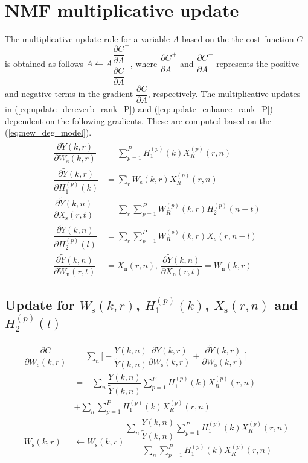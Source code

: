 \section{NMF multiplicative update}
\label{sec:nmf_update}
The multiplicative update rule for a variable $A$ based on the the cost function $C$ is obtained as follows $A \leftarrow A \dfrac{\dfrac{\partial C}{\partial A}^-}{\dfrac{\partial C}{\partial A}^+}$,
where $\dfrac{\partial C}{\partial A}^+$ and $\dfrac{\partial C}{\partial A}^-$ represents the positive and negative terms in the gradient $ \dfrac{\partial C}{\partial A}$, respectively. 
The multiplicative updates in (\ref{eq:update_dereverb_rank_P}) and (\ref{eq:update_enhance_rank_P}) dependent on the following gradients. These are computed based on the (\ref{eq:new_deg_model}).
\begin{align}
\dfrac{\partial \tilde{Y}(k,r)}{\partial W_{\text{s}}(k,r)} & =\sum_{p=1}^P H_1^{(p)}(k)X_R^{(p)}(r,n) \nonumber\\
\dfrac{\partial \tilde{Y}(k,r)}{\partial H_1^{(p)}(k)} & =\sum_r W_{\text{s}}(k,r)X_R^{(p)}(r,n) \nonumber\\
\dfrac{\partial \tilde{Y}(k,n)}{\partial X_{\text{s}}(r,t)} & =\sum_r \sum_{p=1}^P W_R^{(p)}(k,r)H_2^{(p)}(n-t) \nonumber\\
\dfrac{\partial \tilde{Y}(k,n)}{\partial H_2^{(p)}(l)} & =\sum_r \sum_{p=1}^P W_R^{(p)}(k,r)X_s(r,n-l) \nonumber\\
\dfrac{\partial \tilde{Y}(k,n)}{\partial W_{\text{n}}(r,t)} &= X_{\text{n}}(r,n) \text{,   } \dfrac{\partial \tilde{Y}(k,n)}{\partial X_{\text{n}}(r,t)} = W_{\text{n}}(k,r)  
\label{eq:intermediate_1}
\end{align}
\subsection{Update for $W_{\text{s}}(k,r)$, $H_1^{(p)}(k)$, $X_{\text{s}}(r,n)$ and $H_2^{(p)}(l)$}
\label{sec:update_dereverb_1}
\begin{align}
\dfrac{\partial C}{\partial W_{\text{s}}(k,r)} &= \sum_n \Bigg[-\dfrac{Y(k,n)}{\tilde{Y}(k,n)} \dfrac{\partial \tilde{Y}(k,r)}{\partial W_{\text{s}}(k,r)} + \dfrac{\partial \tilde{Y}(k,r)}{\partial W_{\text{s}}(k,r)} \Bigg] \nonumber \\
&= -\sum_n \dfrac{Y(k,n)}{\tilde{Y}(k,n)} \sum_{p=1}^P H_1^{(p)}(k)X_R^{(p)}(r,n)\nonumber \\ 
& + \sum_n \sum_{p=1}^P H_1^{(p)}(k)X_R^{(p)}(r,n) \nonumber \\
W_{\text{s}}(k,r) &\leftarrow W_{\text{s}}(k,r) \dfrac{\sum\limits_n \dfrac{Y(k,n)}{\tilde{Y}(k,n)}\sum\limits_{p=1}^P H_1^{(p)}(k)X_R^{(p)}(r,n)}{\sum\limits_n \sum\limits_{p=1}^P H_1^{(p)}(k)X_R^{(p)}(r,n)}
\label{eq:updateWs}
\end{align}

